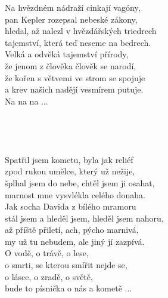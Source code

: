 \begin{multicols}{2}
\singlespacing

\sloka
Na hvězdném nádraží cinkají vagóny,\\
pan Kepler rozepsal nebeské zákony,\\
hledal, až nalezl v hvězdářských triedrech\\
tajemství, která teď neseme na bedrech.\\

\sloka
Velká a odvěká tajemství přírody,\\
že jenom z člověka člověk se narodí,\\
že kořen s větvemi ve strom se spojuje\\
a krev našich nadějí vesmírem putuje.\\

Na na na ...\\
\\
\\
\\
\\

\sloka
Spatřil jsem kometu, byla jak reliéf\\
zpod rukou umělce, který už nežije,\\
šplhal jsem do nebe, chtěl jsem ji osahat,\\
marnost mne vysvlékla celého donaha.\\

\sloka
Jak socha Davida z bílého mramoru\\
stál jsem a hleděl jsem, hleděl jsem nahoru,\\
až příště přiletí, ach, pýcho marnivá,\\
my už tu nebudem, ale jiný jí zazpívá.\\

O vodě, o trávě, o lese,\\
o smrti, se kterou smířit nejde se,\\
o lásce, o zradě, o světě,\\
bude to písnička o nás a kometě ...\\

\end{multicols}